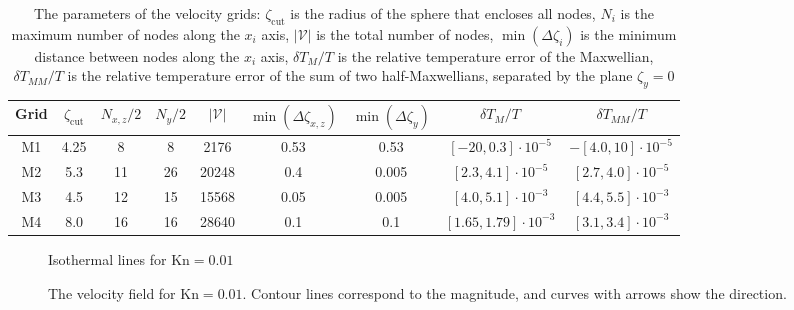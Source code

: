 \documentclass[10pt]{article}
\newcommand{\Kn}{\mathrm{Kn}}
\begin{document}
\setlength{\tabcolsep}{4pt}
\begin{table}
    \caption{The parameters of the velocity grids:
        \(\zeta_{\mathrm{cut}}\) is the radius of the sphere that encloses all nodes,
        \(N_i\) is the maximum number of nodes along the \(x_i\) axis,
        \(|\mathcal{V}|\) is the total number of nodes,
        \(\min(\Delta\zeta_i)\) is the minimum distance between nodes along the \(x_i\) axis,
        \(\delta T_M/T\) is the relative temperature error of the Maxwellian,
        \(\delta T_{MM}/T\) is the relative temperature error of the sum of two half-Maxwellians,
        separated by the plane \(\zeta_y=0\)}
    \label{table:velocity_grids}
    \centering
    \begin{tabular}{ccccccccc}
        Grid & \(\zeta_{\mathrm{cut}}\) & \(N_{x,z}/2\) & \(N_y/2\) & \(|\mathcal{V}|\)
            & \(\min(\Delta\zeta_{x,z})\) & \(\min(\Delta\zeta_y)\) & \(\delta T_M/T\) & \(\delta T_{MM}/T\) \\\hline
        M1 & 4.25 & 8  & 8  & 2176  & 0.53 & 0.53  & \([-20,0.3]\cdot10^{-5}\)   & \(-[4.0,10]\cdot10^{-5}\) \\
        M2 & 5.3  & 11 & 26 & 20248 & 0.4  & 0.005 & \([2.3,4.1]\cdot10^{-5}\)   & \([2.7,4.0]\cdot10^{-5}\) \\
        M3 & 4.5  & 12 & 15 & 15568 & 0.05 & 0.005 & \([4.0,5.1]\cdot10^{-3}\)   & \([4.4,5.5]\cdot10^{-3}\) \\
        M4 & 8.0  & 16 & 16 & 28640 & 0.1  & 0.1   & \([1.65,1.79]\cdot10^{-3}\) & \([3.1,3.4]\cdot10^{-3}\) \\
    \end{tabular}
\end{table}

\begin{figure}
    \centering
    \caption{Isothermal lines for \(\Kn=0.01\)}
    \label{fig:kn0.01:temp}
\end{figure}

\begin{figure}
    \centering
    \caption{The velocity field for \(\Kn=0.01\).
        Contour lines correspond to the magnitude, and curves with arrows show the direction.}
    \label{fig:kn0.01:flow}
\end{figure}
\end{document}
